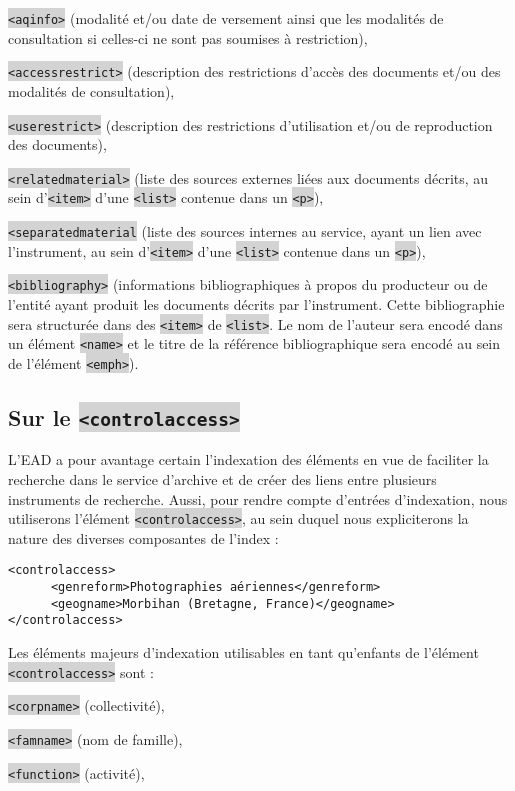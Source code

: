 \documentclass[hidelinks, 13pt]{report}
\newcommand{\code}[1]{\colorbox{LightGray}{\texttt{#1}}}
\begin{document}
	\code{<aqinfo>} (modalité et/ou date de versement ainsi que les modalités de consultation si celles-ci ne sont pas soumises à restriction),
	
	\code{<accessrestrict>} (description des restrictions d'accès des documents et/ou des modalités de consultation),
	
	\code{<userestrict>} (description des restrictions d'utilisation et/ou de reproduction des documents),

	\code{<relatedmaterial>} (liste des sources externes liées aux documents décrits, au sein d'\code{<item>} d'une \code{<list>} contenue dans un \code{<p>}),
	
	\code{<separatedmaterial} (liste des sources internes au service, ayant un lien avec l'instrument, au sein d'\code{<item>} d'une \code{<list>} contenue dans un \code{<p>}),
	
	\code{<bibliography>} (informations bibliographiques à propos du producteur ou de l'entité ayant produit les documents décrits par l'instrument. Cette bibliographie sera structurée dans des \code{<item>} de \code{<list>}. Le nom de l'auteur sera encodé dans un élément \code{<name>} et le titre de la référence bibliographique sera encodé au sein de l'élément \code{<emph>}).
	
	\subsection{Sur le \code{<controlaccess>}}
	
	L'EAD a pour avantage certain l'indexation des éléments en vue de faciliter la recherche dans le service d'archive et de créer des liens entre plusieurs instruments de recherche. Aussi, pour rendre compte d'entrées d'indexation, nous utiliserons l'élément \code{<controlaccess>}, au sein duquel nous expliciterons la nature des diverses composantes de l'index :
	
\begin{lstlisting}[language=EAD]
<controlaccess>
      <genreform>Photographies aériennes</genreform>
      <geogname>Morbihan (Bretagne, France)</geogname>
</controlaccess>
\end{lstlisting}
	
	Les éléments majeurs d'indexation utilisables en tant qu'enfants de l'élément \code{<controlaccess>} sont :

	\code{<corpname>} (collectivité),
	
	\code{<famname>} (nom de famille),
	
	\code{<function>} (activité),
	
\end{document}
